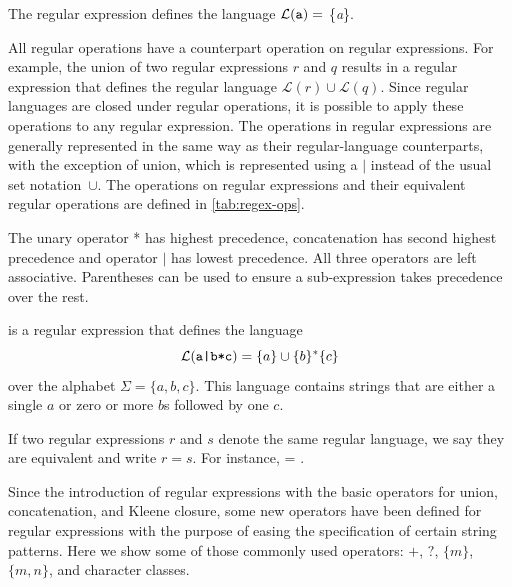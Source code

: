 \begin{example}
The regular expression  defines the language \(\mathcal{L}({\texttt{a}}) =\) \{\textit{a}\}.
\end{example}{}



All regular operations have a counterpart operation on regular expressions. For example, the union of two regular expressions \(r\) and \(q\) results in a regular expression that defines the regular language \(\mathcal{L}(r) \cup \mathcal{L}(q)\). 
Since regular languages are closed under regular operations, it is possible to apply these operations to any regular expression.
The operations in regular expressions are generally represented in the same way as their regular-language counterparts, with the exception of union, which is represented using a \(|\) instead of the usual set notation~\(\cup\). The operations on regular expressions and their equivalent regular operations  are defined in \autoref{tab:regex-ops}.

The unary operator * has highest precedence, concatenation has second highest precedence and operator \(|\) has lowest precedence.
All three operators are left associative. Parentheses can be used to ensure a sub-expression takes precedence over the rest.

\begin{example}
 is a regular expression that defines the language
\[\mathcal{L}(\texttt{a|b*c}) = \{a\} \cup \{b\}^* \{c\}\]
over the alphabet \(\Sigma = \{a, b, c\}\). This language contains strings that are either a single \(a\) or zero or more \(b\)s followed by one \(c\).
\end{example}

If two regular expressions \(r\) and \(s\) denote the same regular language, we say they are equivalent and write \(r = s\). For instance,  = . %

% 

\medskip
Since the introduction of regular expressions with the basic operators for union, concatenation, and Kleene closure, some new operators have been defined for regular expressions with the purpose of easing the specification of certain string patterns. Here we show some of those commonly used operators: \(+\), \(?\), \(\{m\}\), \(\{m,n\}\), and character classes.

